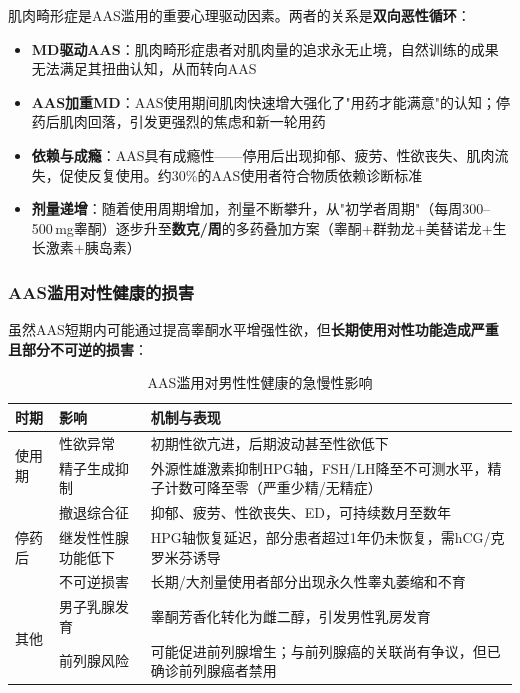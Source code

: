 \begin{enumerate}
肌肉畸形症是AAS滥用的重要心理驱动因素。两者的关系是\textbf{双向恶性循环}：

\begin{itemize}[leftmargin=2cm]
	\item \textbf{MD驱动AAS}：肌肉畸形症患者对肌肉量的追求永无止境，自然训练的成果无法满足其扭曲认知，从而转向AAS
	\item \textbf{AAS加重MD}：AAS使用期间肌肉快速增大强化了"用药才能满意"的认知；停药后肌肉回落，引发更强烈的焦虑和新一轮用药
	\item \textbf{依赖与成瘾}：AAS具有成瘾性——停用后出现抑郁、疲劳、性欲丧失、肌肉流失，促使反复使用。约30\%的AAS使用者符合物质依赖诊断标准
	\item \textbf{剂量递增}：随着使用周期增加，剂量不断攀升，从"初学者周期"（每周300--500\,mg睾酮）逐步升至\textbf{数克/周}的多药叠加方案（睾酮+群勃龙+美替诺龙+生长激素+胰岛素）
\end{itemize}

\subsubsection{AAS滥用对性健康的损害}

虽然AAS短期内可能通过提高睾酮水平增强性欲，但\textbf{长期使用对性功能造成严重且部分不可逆的损害}：

\begin{table}[htbp]
\centering
\caption{AAS滥用对男性性健康的急慢性影响}
\label{tab:aas_sexual_effects}
\begin{tabularx}{\textwidth}{@{}llX@{}}
    \toprule
    \textbf{时期} & \textbf{影响} & \textbf{机制与表现} \\
    \midrule
    \multirow{2}{*}{使用期} & 性欲异常 & 初期性欲亢进，后期波动甚至性欲低下 \\
     & 精子生成抑制 & 外源性雄激素抑制HPG轴，FSH/LH降至不可测水平，精子计数可降至零（严重少精/无精症） \\
    \midrule
    \multirow{3}{*}{停药后} & 撤退综合征 & 抑郁、疲劳、性欲丧失、ED，可持续数月至数年 \\
     & 继发性性腺功能低下 & HPG轴恢复延迟，部分患者超过1年仍未恢复，需hCG/克罗米芬诱导 \\
     & 不可逆损害 & 长期/大剂量使用者部分出现永久性睾丸萎缩和不育 \\
    \midrule
    \multirow{2}{*}{其他} & 男子乳腺发育 & 睾酮芳香化转化为雌二醇，引发男性乳房发育 \\
     & 前列腺风险 & 可能促进前列腺增生；与前列腺癌的关联尚有争议，但已确诊前列腺癌者禁用 \\
    \bottomrule
\end{tabularx}
\end{table}


\end{enumerate}
